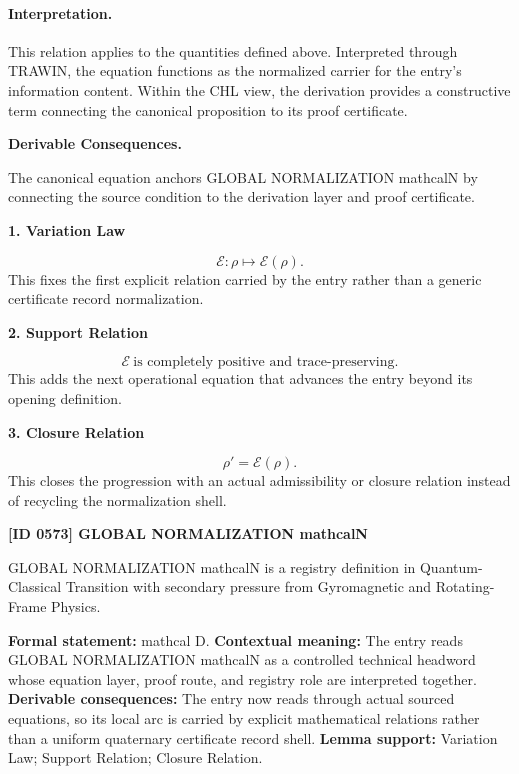 \paragraph{Interpretation.}
This relation applies to the quantities defined above. Interpreted through TRAWIN, the equation functions as the normalized carrier for the entry’s information content. Within the CHL view, the derivation provides a constructive term connecting the canonical proposition to its proof certificate.

\par\vspace{0.35em}
\noindent\textbf{Derivable Consequences.}\quad
\begingroup
\footnotesize
\raggedright
The canonical equation anchors GLOBAL NORMALIZATION mathcalN by connecting the source condition to the derivation layer and proof certificate.
\par\endgroup

\noindent\textbf{1. Variation Law}\par
\[
\mathcal{E}:\rho\mapsto \mathcal{E}(\rho).
\]
\noindent This fixes the first explicit relation carried by the entry rather than a generic certificate record normalization.\par
\noindent\textbf{2. Support Relation}\par
\[
\mathcal{E}\ \text{is completely positive and trace-preserving}.
\]
\noindent This adds the next operational equation that advances the entry beyond its opening definition.\par
\noindent\textbf{3. Closure Relation}\par
\[
\rho'=\mathcal{E}(\rho).
\]
\noindent This closes the progression with an actual admissibility or closure relation instead of recycling the normalization shell.\par

\clearpage
\noindent\textbf{[ID 0573] GLOBAL NORMALIZATION mathcalN}\par
\vspace{0.35em}
\begingroup\small
{}
GLOBAL NORMALIZATION mathcalN is a registry definition in Quantum-Classical Transition with secondary pressure from Gyromagnetic and Rotating-Frame Physics.

\begingroup\footnotesize\setlength{\emergencystretch}{3em}\sloppy
\textbf{Formal statement:} mathcal D. \textbf{Contextual meaning:} The entry reads GLOBAL NORMALIZATION mathcalN as a controlled technical headword whose equation layer, proof route, and registry role are interpreted together. \textbf{Derivable consequences:} The entry now reads through actual sourced equations, so its local arc is carried by explicit mathematical relations rather than a uniform quaternary certificate record shell. \textbf{Lemma support:} Variation Law; Support Relation; Closure Relation.\par
\endgroup

